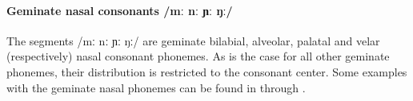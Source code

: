 \paragraph{Geminate nasal consonants /mː nː ɲː ŋː/}
The segments /mː nː ɲː ŋː/ are geminate bilabial, alveolar, palatal and velar (respectively) nasal consonant phonemes. 
As is the case for all other geminate phonemes, their distribution is restricted to the consonant center. Some examples with the geminate nasal phonemes can be found in  through .



